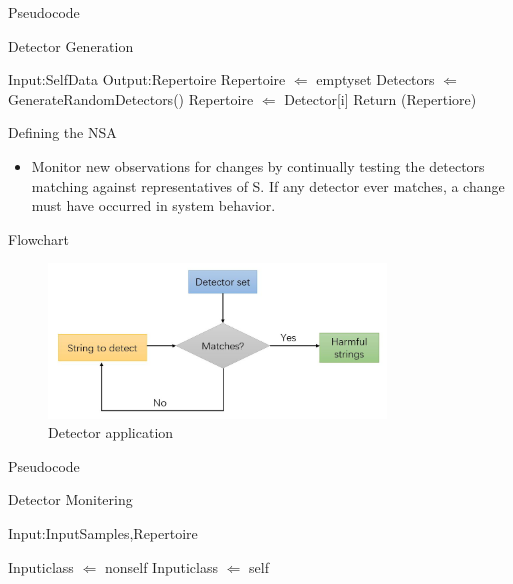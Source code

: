 \begin{frame}{Pseudocode}
 \begin{algorithm}[H]
  \caption{Detector Generation}          
  \label{alg1}      %
    \begin{algorithmic}  
       \STATE Input:SelfData
       \STATE Output:Repertoire
       \STATE Repertoire $\Leftarrow$ emptyset
       \STATE Detectors $\Leftarrow$ GenerateRandomDetectors()
       \STATE Repertoire $\Leftarrow$ Detector[i]
       \ENDIF
       \ENDFOR
       \ENDWHILE
       \STATE Return (Repertiore)

    \end{algorithmic}
  \end{algorithm} 
\end{frame}

\begin{frame}{Defining the NSA}
  \begin{itemize}
  \item {
    Monitor new observations for changes by continually testing the detectors matching against representatives of S.  If any detector ever matches, a change must have occurred in system behavior.
  }
  \end{itemize}
\end{frame}

\begin{frame}{Flowchart}
  \begin{figure}[hb]
  \centering
  \includegraphics[width=0.8\textwidth]{img/NSAflowchart2.jpg}
  \caption{Detector application}
  \end{figure}
\end{frame}

\begin{frame}{Pseudocode}
 \begin{algorithm}[H]
  \caption{Detector Monitering}          
  \label{alg2}      
    \begin{algorithmic}  
       \STATE Input:InputSamples,Repertoire
  
       \STATE Inputiclass $\Leftarrow$ nonself  
       \STATE Inputiclass $\Leftarrow$ self
       \ENDIF
       \ENDFOR
       \ENDFOR            
    \end{algorithmic}
  \end{algorithm} 
\end{frame}

